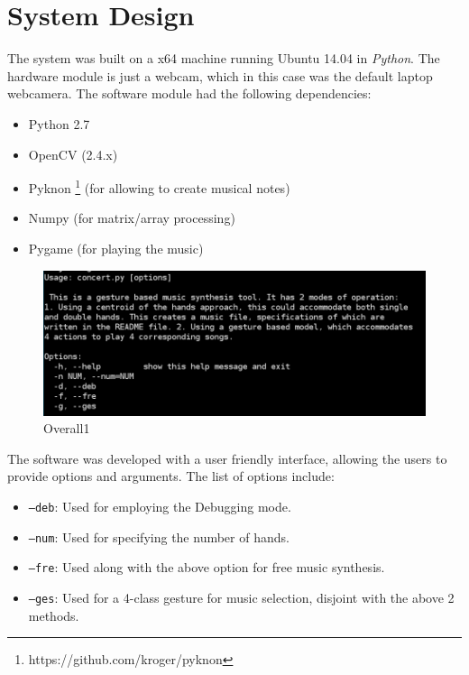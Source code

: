 \documentclass[letterpaper, 10 pt, twoside, conference]{ieeeconf}
\begin{document}
\section{System Design}
The system was built on a x64 machine running Ubuntu 14.04 in \textit{Python}. The hardware module is just a webcam,
which in this case was the default laptop webcamera. The software module had the following dependencies:
\begin{itemize}
  \item Python 2.7
  \item OpenCV (2.4.x)
  \item Pyknon \footnote{https://github.com/kroger/pyknon} (for allowing to create musical notes)
  \item Numpy (for matrix/array processing)
  \item Pygame (for playing the music)
\end{itemize}
\begin{figure}[h]
  \centering
  \includegraphics[width=\columnwidth]{concert.png}
  \caption{Overall1}
  \label{Overall1}
\end{figure}
The software was developed with a user friendly interface, allowing the users to provide
options and arguments. The list of options include:
\begin{itemize}
  \item \texttt{--deb}: Used for employing the Debugging mode.
  \item \texttt{--num}: Used for specifying the number of hands.
  \item \texttt{--fre}: Used along with the above option for free music synthesis.
  \item \texttt{--ges}: Used for a 4-class gesture for music selection, disjoint with the
    above 2 methods.
\end{itemize}
\end{document}
